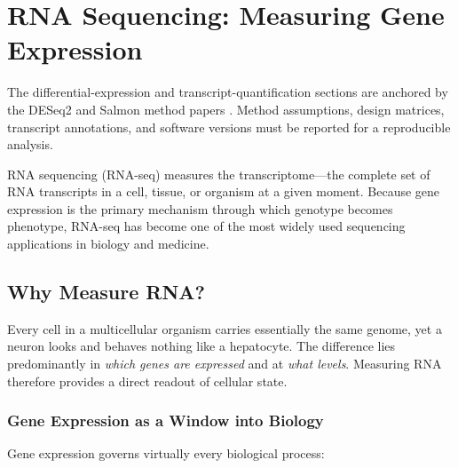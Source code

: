 \chapter{RNA Sequencing: Measuring Gene Expression}
\label{ch:rnaseq}

\begin{sourcebox}
The differential-expression and transcript-quantification sections are anchored by the DESeq2 and Salmon method papers \cite{love2014,patro2017}. Method assumptions, design matrices, transcript annotations, and software versions must be reported for a reproducible analysis.
\end{sourcebox}

\begin{keyconcept}
RNA sequencing (\acrshort{RNA-seq}) measures the transcriptome---the complete set of RNA
transcripts in a cell, tissue, or organism at a given moment. Because gene
expression is the primary mechanism through which genotype becomes phenotype,
\acrshort{RNA-seq} has become one of the most widely used sequencing applications in
biology and medicine.
\end{keyconcept}

\section{Why Measure RNA?}
\label{sec:rnaseq:why}

Every cell in a multicellular organism carries essentially the same genome, yet
a neuron looks and behaves nothing like a hepatocyte. The difference lies
predominantly in \emph{which genes are expressed} and at \emph{what levels}.
Measuring RNA therefore provides a direct readout of cellular state.

\subsection{Gene Expression as a Window into Biology}

Gene expression governs virtually every biological process:

